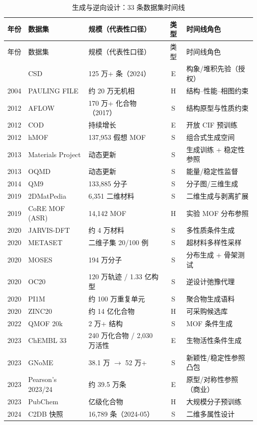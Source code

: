 \documentclass[11pt,a4paper]{ctexart}
\begin{document}
\begin{longtable}{@{}p{1.1cm}p{3.6cm}p{4.3cm}cp{5.4cm}@{}}
\caption{生成与逆向设计：33 条数据集时间线}\\
\toprule
年份 & 数据集 & 规模（代表性口径） & 类型 & 时间线角色 \\
\midrule
\endfirsthead
\toprule
年份 & 数据集 & 规模（代表性口径） & 类型 & 时间线角色 \\
\midrule
\endhead
\bottomrule
\endfoot
1965 & CSD & 125 万+ 条（2024） & E & 构象/堆积先验（授权） \\
2004 & PAULING FILE & 约 20 万无机相 & H & 结构--性能--相图约束 \\
2012 & AFLOW & 170 万+ 化合物（2017） & S & 结构原型与性质约束 \\
2012 & COD & 持续增长 & E & 开放 CIF 预训练 \\
2012 & hMOF & 137,953 假想 MOF & S & 组合式生成空间 \\
2013 & Materials Project & 动态更新 & S & 生成训练 + 稳定性参照 \\
2013 & OQMD & 动态更新 & S & 能量/稳定性监督 \\
2014 & QM9 & 133,885 分子 & S & 分子图/三维生成 \\
2019 & 2DMatPedia & 6,351 二维材料 & S & 二维生成与剥离扩展 \\
2019 & CoRE MOF (ASR) & 14,142 MOF & H & 实验 MOF 分布参照 \\
2020 & JARVIS-DFT & 约 4 万材料 & S & 多性质条件生成 \\
2020 & METASET & 二维子集 20/100 例 & S & 超材料多样性采样 \\
2020 & MOSES & 194 万分子 & S & 分布生成 + 骨架测试 \\
2020 & OC20 & 120 万轨迹 / 1.33 亿构型 & S & 逆设计弛豫代理 \\
2020 & PI1M & 约 100 万重复单元 & S & 聚合物生成语料 \\
2020 & ZINC20 & 约 14 亿化合物 & H & 可采购候选库 \\
2022 & QMOF 20k & 2 万+ 结构 & S & MOF 条件生成 \\
2023 & ChEMBL 33 & 240 万化合物 / 2,030 万活性 & E & 生物活性条件生成 \\
2023 & GNoME & 38.1 万 $\to$ 52 万+ & S & 新颖性/稳定性参照凸包 \\
2023 & Pearson's 2023/24 & 约 39.5 万条 & E & 原型/对称性参照（商业） \\
2023 & PubChem & 亿级化合物 & H & 大规模分子预训练 \\
2024 & C2DB 快照 & 16,789 条（2024-05） & S & 二维多属性设计 \\

\end{longtable}
\end{document}
